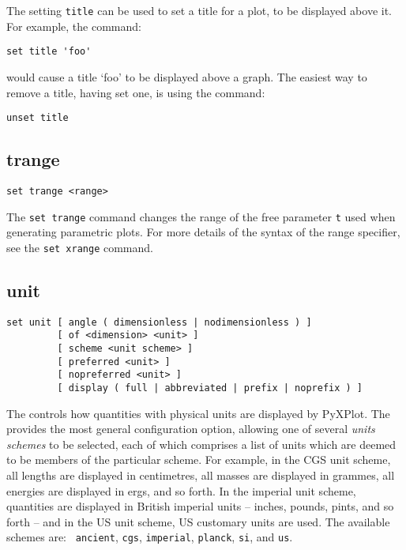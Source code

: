 The setting {\tt title} can be used to set a title for a plot, to be displayed
above it.  For example, the command:

\begin{verbatim}
set title 'foo'
\end{verbatim}

\noindent would cause a title `foo' to be displayed above a graph. The easiest
way to remove a title, having set one, is using the command:

\begin{verbatim}
unset title
\end{verbatim}


\subsection{trange}

\begin{verbatim}
set trange <range>
\end{verbatim}

The {\tt set trange} command changes the range of the free parameter {\tt t}
used when generating parametric plots.  For more details of the syntax of the
range specifier, see the {\tt set xrange} command.

\subsection{unit}

\begin{verbatim}
set unit [ angle ( dimensionless | nodimensionless ) ]
         [ of <dimension> <unit> ]
         [ scheme <unit scheme> ]
         [ preferred <unit> ]
         [ nopreferred <unit> ]
         [ display ( full | abbreviated | prefix | noprefix ) ]
\end{verbatim}

The  controls how quantities with physical units are
displayed by PyXPlot. The  provides the most general
configuration option, allowing one of several {\it units
schemes} to be selected, each of which comprises a
list of units which are deemed to be members of the particular scheme. For
example, in the CGS unit scheme, all lengths
are displayed in centimetres, all masses are displayed in grammes, all energies
are displayed in ergs, and so forth.  In the imperial unit
scheme, quantities are displayed in
British imperial units -- inches, pounds, pints, and so forth -- and in the US
unit scheme, US customary units are used. The available schemes are: {\tt
ancient}, {\tt cgs}, {\tt imperial}, {\tt planck}, {\tt si}, and {\tt us}.

